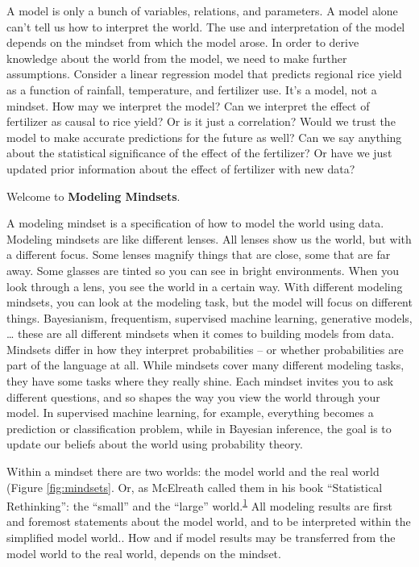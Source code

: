 \documentclass[
  10pt,
]{scrbook}
\begin{document}
A model is only a bunch of variables, relations, and parameters.
A model alone can't tell us how to interpret the world.
The use and interpretation of the model depends on the mindset from which the model arose.
In order to derive knowledge about the world from the model, we need to make further assumptions.
Consider a linear regression model that predicts regional rice yield as a function of rainfall, temperature, and fertilizer use.
It's a model, not a mindset.
How may we interpret the model?
Can we interpret the effect of fertilizer as causal to rice yield? Or is it just a correlation?
Would we trust the model to make accurate predictions for the future as well?
Can we say anything about the statistical significance of the effect of the fertilizer?
Or have we just updated prior information about the effect of fertilizer with new data?

Welcome to \textbf{Modeling Mindsets}.

A modeling mindset is a specification of how to model the world using data.
Modeling mindsets are like different lenses.
All lenses show us the world, but with a different focus.
Some lenses magnify things that are close, some that are far away.
Some glasses are tinted so you can see in bright environments.
When you look through a lens, you see the world in a certain way.
With different modeling mindsets, you can look at the modeling task, but the model will focus on different things.
Bayesianism, frequentism, supervised machine learning, generative models, \ldots{} these are all different mindsets when it comes to building models from data.
Mindsets differ in how they interpret probabilities -- or whether probabilities are part of the language at all.
While mindsets cover many different modeling tasks, they have some tasks where they really shine.
Each mindset invites you to ask different questions, and so shapes the way you view the world through your model.
In supervised machine learning, for example, everything becomes a prediction or classification problem, while in Bayesian inference, the goal is to update our beliefs about the world using probability theory.

Within a mindset there are two worlds: the model world and the real world (Figure \ref{fig:mindsets}.
Or, as McElreath called them in his book ``Statistical Rethinking'': the ``small'' and the ``large'' world.\textsuperscript{\protect\hyperlink{ref-mcelreath2020statistical}{1}}
All modeling results are first and foremost statements about the model world, and to be interpreted within the simplified model world..
How and if model results may be transferred from the model world to the real world, depends on the mindset.
\end{document}
